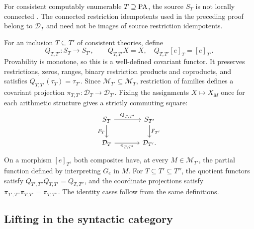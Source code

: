 For consistent computably enumerable $T\supseteq\mathrm{PA}$, the source $S_T$
is not locally connected \cite[Corollary 4.4, pp.~657--658]{DPM}.
The connected restriction idempotents used in the preceding proof
belong to $\mathcal D_T$ and need not be images of source restriction
idempotents.

For an inclusion $T\subseteq T'$ of consistent theories, define
\[
 Q_{T,T'}:S_T\to S_{T'},\qquad
 Q_{T,T'}X=X,\quad Q_{T,T'}[e]_T=[e]_{T'}.
\]
Provability is monotone, so this is a well-defined covariant functor.
It preserves restrictions, zeros, ranges, binary restriction products
and coproducts, and satisfies $Q_{T,T'}(\tau_T)=\tau_{T'}$.
Since $\mathcal M_{T'}\subseteq\mathcal M_T$, restriction of families
defines a covariant projection
$\pi_{T,T'}:\mathcal D_T\to\mathcal D_{T'}$. Fixing the assignments
$X\mapsto X_M$ once for each arithmetic structure gives a strictly
commuting square:
\[
\begin{tikzcd}[column sep=large]
 S_T \arrow[r,"Q_{T,T'}"] \arrow[d,"F_T"'] &
 S_{T'} \arrow[d,"F_{T'}"]\\
 \mathcal D_T \arrow[r,"\pi_{T,T'}"'] & \mathcal D_{T'}.
\end{tikzcd}
\]
On a morphism $[e]_T$, both composites have, at every
$M\in\mathcal M_{T'}$, the partial function defined by interpreting
$G_e$ in $M$. For $T\subseteq T'\subseteq T''$, the quotient
functors satisfy $Q_{T',T''}Q_{T,T'}=Q_{T,T''}$, and the coordinate
projections satisfy
$\pi_{T',T''}\pi_{T,T'}=\pi_{T,T''}$.
The identity cases follow from the same definitions.

\subsection{Lifting in the syntactic category}


